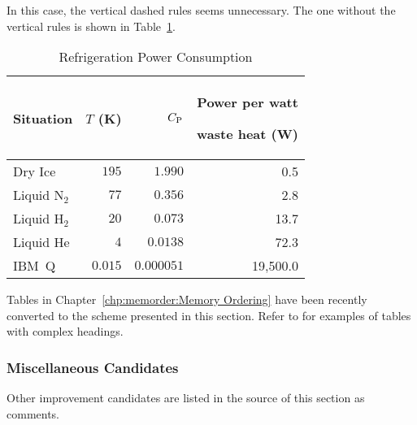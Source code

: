 In this case, the vertical dashed rules seems unnecessary.
The one without the vertical rules is shown in
Table~\ref{tab:app:styleguide:Refrigeration Power Consumption (arydshln-2)}.

\begin{table}[H]
\renewcommand*{\arraystretch}{1.2}\centering\small
\begin{tabular}{lrrr}\toprule
Situation
	& $T$ (K)
		& $C_\mathrm{P}$ & \parbox[b]{.75in}{\raggedleft Power per watt\par waste heat (W)} \\
\midrule
Dry Ice
	& $195$
		& $1.990$
			& 0.5 \\ \hdashline
Liquid N$_2$
	& $77$
		& $0.356$
			& 2.8 \\ \hdashline
Liquid H$_2$
	& $20$
		& $0.073$
			& 13.7 \\ \hdashline
Liquid He
	& $4$
		& $0.0138$
			& 72.3 \\ \hdashline
IBM~Q	& $0.015$
		& $0.000051$
			& 19,500.0 \\
\bottomrule
\end{tabular}
\caption{Refrigeration Power Consumption}
\label{tab:app:styleguide:Refrigeration Power Consumption (arydshln-2)}
\end{table}

Tables in Chapter~\ref{chp:memorder:Memory Ordering}
have been recently converted to the scheme presented in this section.
Refer to 
for examples of tables with complex headings.

\captionsetup[table]{position=bottom,hangindent=0pt}
\renewcommand*{\abovetopsep}{0pt}

\subsubsection{Miscellaneous Candidates}
\label{sec:app:styleguide:Miscellaneous Candidates}

Other improvement candidates are listed in the source of this
section as comments.

%
%
%
